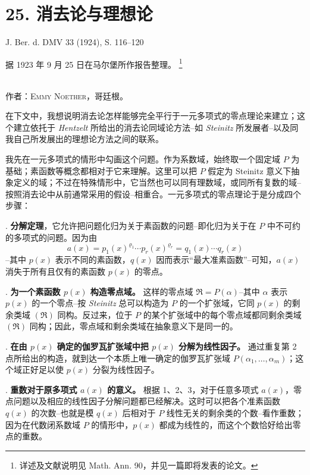 \documentclass[11pt]{article}
\newcommand{\frakR}{\mathfrak R}
\newcommand{\srcfn}[2]{%
  \begingroup
  \renewcommand{\thefootnote}{#1}%
  \footnote{#2}%
  \addtocounter{footnote}{-1}%
  \endgroup}
\newcommand{\srcemph}[1]{\textbf{#1}}
\begin{document}
\section*{25. 消去论与理想论}

\begin{center}
J. Ber. d. DMV 33 (1924), S. 116--120
\end{center}

\setcounter{footnote}{0}

\begin{center}
据 1923 年 9 月 25 日在马尔堡所作报告整理。\srcfn{1)}{详述及文献说明见 Math. Ann. 90，并见一篇即将发表的论文。}\\[0.5em]
作者：\textsc{Emmy Noether}，哥廷根。
\end{center}

在下文中，我想说明消去论怎样能够完全平行于一元多项式的零点理论来建立；这个建立依托于 \emph{Hentzelt} 所给出的消去论同域论方法--如 \emph{Steinitz} 所发展者--以及同我自己所发展出的理想论方法之间的联系。

我先在一元多项式的情形中勾画这个问题。作为系数域，始终取一个固定域 $P$ 为基础；素函数等概念都相对于它来理解。这里可以把 $P$ 假定为 Steinitz 意义下抽象定义的域；不过在特殊情形中，它当然也可以同有理数域，或同所有复数的域--按照消去论中从前通常采用的假设--相重合。一元多项式的零点理论于是分成四个步骤：

. \srcemph{分解定理}，它允许把问题化归为关于素函数的问题--即化归为关于在 $P$ 中不可约的多项式的问题。因为由
\[
 a(x)=p_1(x)^{\varrho_1}\cdots p_r(x)^{\varrho_r}=q_1(x)\cdots q_r(x)
\]
--其中 $p(x)$ 表示不同的素函数，$q(x)$ 因而表示“最大准素函数”--可知，$a(x)$ 消失于所有且仅有的素函数 $p(x)$ 的零点。

. \srcemph{为一个素函数 $p(x)$ 构造零点域。} 这样的零点域 $\frakR=P(\alpha)$--其中 $\alpha$ 表示 $p(x)$ 的一个零点--按 \emph{Steinitz} 总可以构造为 $P$ 的一个扩张域，它同 $p(x)$ 的剩余类域 $(\frakR)$ 同构。反过来，位于 $P$ 的某个扩张域中的每个零点域都同剩余类域 $(\frakR)$ 同构；因此，零点域和剩余类域在抽象意义下是同一的。

. \srcemph{在由 $p(x)$ 确定的伽罗瓦扩张域中把 $p(x)$ 分解为线性因子。} 通过重复第 2 点所给出的构造，就到达一个本质上唯一确定的伽罗瓦扩张域 $P(\alpha_1,\ldots,\alpha_m)$；这个域正好足以使 $p(x)$ 分裂为线性因子。

. \srcemph{重数对于原多项式 $a(x)$ 的意义。} 根据 1、2、3，对于任意多项式 $a(x)$，零点问题以及相应的线性因子分解问题都已经解决。这时可以把各个准素函数 $q(x)$ 的次数--也就是模 $q(x)$ 后相对于 $P$ 线性无关的剩余类的个数--看作重数；因为在代数闭系数域 $P$ 的情形中，$p(x)$ 都成为线性的，而这个个数恰好给出零点的重数。
\end{document}
